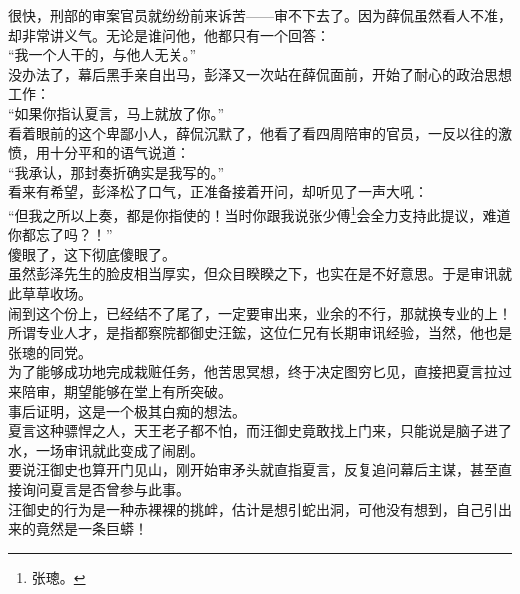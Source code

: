 \begin{multicols}{\theparacolNo}
很快，刑部的审案官员就纷纷前来诉苦——审不下去了。因为薛侃虽然看人不准，却非常讲义气。无论是谁问他，他都只有一个回答：\\

“我一个人干的，与他人无关。”\\

没办法了，幕后黑手亲自出马，彭泽又一次站在薛侃面前，开始了耐心的政治思想工作：\\

“如果你指认夏言，马上就放了你。”\\

看着眼前的这个卑鄙小人，薛侃沉默了，他看了看四周陪审的官员，一反以往的激愤，用十分平和的语气说道：\\

“我承认，那封奏折确实是我写的。”\\

看来有希望，彭泽松了口气，正准备接着开问，却听见了一声大吼：\\

“但我之所以上奏，都是你指使的！当时你跟我说张少傅\footnote{张璁。}会全力支持此提议，难道你都忘了吗？！”\\

傻眼了，这下彻底傻眼了。\\

虽然彭泽先生的脸皮相当厚实，但众目睽睽之下，也实在是不好意思。于是审讯就此草草收场。\\

闹到这个份上，已经结不了尾了，一定要审出来，业余的不行，那就换专业的上！\\

所谓专业人才，是指都察院都御史汪鋐，这位仁兄有长期审讯经验，当然，他也是张璁的同党。\\

为了能够成功地完成栽赃任务，他苦思冥想，终于决定图穷匕见，直接把夏言拉过来陪审，期望能够在堂上有所突破。\\

事后证明，这是一个极其白痴的想法。\\

夏言这种骠悍之人，天王老子都不怕，而汪御史竟敢找上门来，只能说是脑子进了水，一场审讯就此变成了闹剧。\\

要说汪御史也算开门见山，刚开始审矛头就直指夏言，反复追问幕后主谋，甚至直接询问夏言是否曾参与此事。\\

汪御史的行为是一种赤裸裸的挑衅，估计是想引蛇出洞，可他没有想到，自己引出来的竟然是一条巨蟒！\\


\end{multicols}
